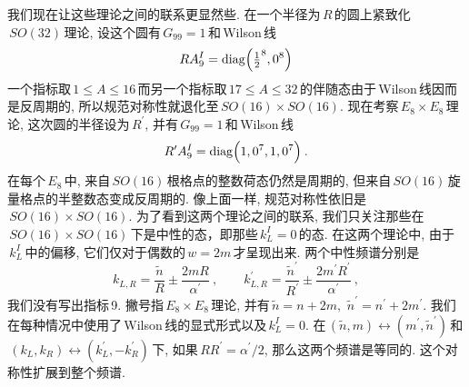 我们现在让这些理论之间的联系更显然些. 在一个半径为$\,R\,$的圆上紧致化$\,SO(32)\,$理论, 设这个圆有$\,G_{99}=1\,$和\,Wilson\,线
\begin{equation}
    RA_{9}^{I}=\operatorname{diag}\Bigl(\tfrac{1}{2}^{8},0^{8}\Bigr)
    \label{11.6.18}
\end{equation}
一个指标取$\,1\leq A\leq 16\,$而另一个指标取$\,17\leq A\leq 32\,$的伴随态由于\,Wilson\,线因而是反周期的, 所以规范对称性就退化至$\,SO(16)\times SO(16)$. 现在考察$\,E_{8}\times E_{8}\,$理论, 这次圆的半径设为$\,R^{\prime}$, 并有$\,G_{99}=1\,$和\,Wilson\,线
\begin{equation}
    R^{\prime}A_{9}^{I}=\operatorname{diag}\Bigl(1,0^{7},1,0^{7}\Bigr) \:.
    \label{11.6.19}
\end{equation}
在每个$\,E_{8}\,$中, 来自$\,SO(16)\,$根格点的整数荷态仍然是周期的, 但来自$\,SO(16)\,$旋量格点的半整数态变成反周期的. 像上面一样, 规范对称性依旧是$\,SO(16)\times SO(16)$. 为了看到这两个理论之间的联系, 我们只关注那些在$\,SO(16)\times SO(16)\,$下是中性的态，即那些$\,k_{L}^{I}=0\,$的态. 在这两个理论中, 由于$\,k_{L}^{I}\,$中的偏移, 它们仅对于偶数的$\,w=2m\,$才呈现出来. 两个中性频谱分别是
\begin{equation}
    k_{L,R}=\frac{\tilde{n}}{R} \pm \frac{2mR}{\alpha^{\prime}}\:,\qquad k_{L,R}^{\prime} =\frac{\tilde{n}^{\prime}}{R^{\prime}} \pm \frac{2m^{\prime}R^{\prime}}{\alpha^{\prime}}\:,
\end{equation}
我们没有写出指标\,9. 撇号指$\,E_{8}\times E_{8}\,$理论, 并有$\,\tilde{n}=n+2m,$ $\tilde{n}^{\prime}=n^{\prime}+2m^{\prime}$. 我们在每种情况中使用了\,Wilson\,线的显式形式以及$\,k_{L}^{I}=0$. 在$\,(\tilde{n},m)\leftrightarrow (m^{\prime},\tilde{n}^{\prime})\,$和$\,(k_{L},k_{R})\leftrightarrow (k_{L}^{\prime},-k_{R}^{\prime})\,$下, 如果$\,RR^{\prime}=\alpha^{\prime}/2$, 那么这两个频谱是等同的. 这个对称性扩展到整个频谱.

